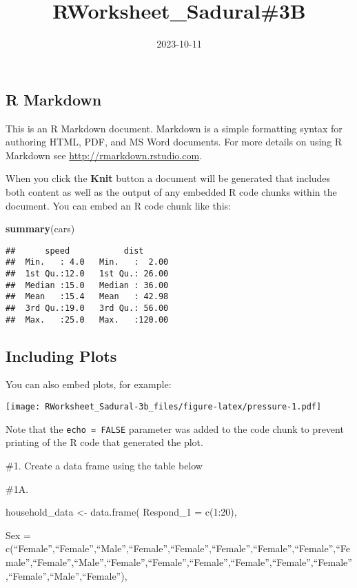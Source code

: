 \documentclass[
]{article}
\title{RWorksheet\_Sadural\#3B}
\author{}
\date{\vspace{-2.5em}2023-10-11}
\newenvironment{Shaded}{\begin{snugshade}}{\end{snugshade}}
\newcommand{\FunctionTok}[1]{\textcolor[rgb]{0.13,0.29,0.53}{\textbf{#1}}}
\newcommand{\NormalTok}[1]{#1}
\begin{document}
\maketitle

\hypertarget{r-markdown}{%
\subsection{R Markdown}\label{r-markdown}}

This is an R Markdown document. Markdown is a simple formatting syntax
for authoring HTML, PDF, and MS Word documents. For more details on
using R Markdown see \url{http://rmarkdown.rstudio.com}.

When you click the \textbf{Knit} button a document will be generated
that includes both content as well as the output of any embedded R code
chunks within the document. You can embed an R code chunk like this:

\begin{Shaded}
\begin{Highlighting}[]
\FunctionTok{summary}\NormalTok{(cars)}
\end{Highlighting}
\end{Shaded}

\begin{verbatim}
##      speed           dist       
##  Min.   : 4.0   Min.   :  2.00  
##  1st Qu.:12.0   1st Qu.: 26.00  
##  Median :15.0   Median : 36.00  
##  Mean   :15.4   Mean   : 42.98  
##  3rd Qu.:19.0   3rd Qu.: 56.00  
##  Max.   :25.0   Max.   :120.00
\end{verbatim}

\hypertarget{including-plots}{%
\subsection{Including Plots}\label{including-plots}}

You can also embed plots, for example:

\texttt{[image: RWorksheet\_Sadural-3b\_files/figure-latex/pressure-1.pdf]}

Note that the \texttt{echo\ =\ FALSE} parameter was added to the code
chunk to prevent printing of the R code that generated the plot.

\#1. Create a data frame using the table below

\#1A.

household\_data \textless- data.frame( Respond\_1 = c(1:20),

Sex =
c(``Female'',``Female'',``Male'',``Female'',``Female'',``Female'',``Female'',``Female'',``Female'',``Female'',``Male'',``Female'',``Female'',``Female'',``Female'',``Female'',``Female'',``Female'',``Male'',``Female''),
\end{document}
